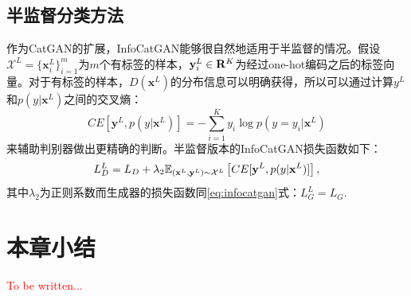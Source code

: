\subsection{半监督分类方法}\label{sec:ss-infocatgan}
作为CatGAN的扩展，InfoCatGAN能够很自然地适用于半监督的情况。假设$\mathcal{X}^L = \{\mathbf{x}_i^L\}_{i=1}^m$为$m$个有标签的样本，$\mathbf{y}_i^L \in \mathbf{R}^K$为经过one-hot编码之后的标签向量。对于有标签的样本，$D(\mathbf{x}^L)$的分布信息可以明确获得，所以可以通过计算$y^L$和$p(y|\mathbf{x}^L)$之间的交叉熵：
\begin{equation}
  \label{eq:celoss}
  CE[\mathbf{y}^L, p(y|\mathbf{x}^L)] = -\sum_{i=1}^K y_i \log p(y=y_i | \mathbf{x}^L)
\end{equation}
来辅助判别器做出更精确的判断。半监督版本的InfoCatGAN损失函数如下：
\begin{equation}
  L_D^L = L_D + \lambda_2 \mathbb{E}_{(\mathbf{x}^L, \mathbf{y}^L) \sim \mathcal{X}^L}\left[ CE[\mathbf{y}^L, p(y|\mathbf{x}^L)] \right],
\end{equation}
其中$\lambda_2$为正则系数而生成器的损失函数同\eqref{eq:infocatgan}式：$L_G^L = L_G$.

\section{本章小结}
\textcolor{red}{To be written...}
